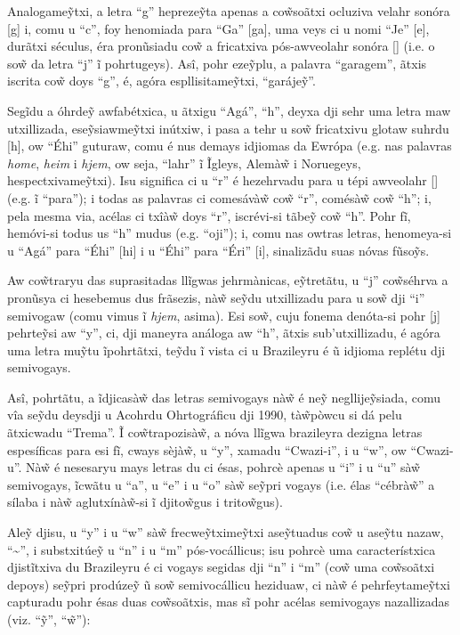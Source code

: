 \documentclass[12pt, a5paper, titlepage]{article}
\begin{document}
\begin{bilingualpages}
    Analogame\~ytxi, a letra ``g'' hepreze\~yta apenas a co\~wsoãtxi ocluziva velahr sonóra [g] i, comu u ``c'', foy henomiada para ``Ga'' [ga], uma veys ci u nomi ``Je'' [\textyogh e], durãtxi séculus, éra pronũsiadu co\~w a fricatxiva pós-awveolahr sonóra [\textyogh] (i.e. o so\~w da letra ``j'' ĩ pohrtugeys). Asî, pohr eze\~yplu, a palavra ``garagem'', ãtxis iscrita co\~w doys ``g'', é, agóra espllisitame\~ytxi, ``garáje\~y''.

    Segĩdu a óhrde\~y awfabétxica, u ãtxigu ``Agá'', ``h'', deyxa dji sehr uma letra maw utxillizada, ese\~ysiawme\~ytxi inútxiw, i pasa a tehr u so\~w fricatxivu glotaw suhrdu [h], ow ``Éhi'' guturaw, comu é nus demays idjiomas da Ewrópa (e.g. nas palavras \textit{home}, \textit{heim} i \textit{hjem}, ow seja, ``lahr'' ĩ Ĩgleys, Alemà\~w i Noruegeys, hespectxivame\~ytxi). Isu significa ci u ``r'' é hezehrvadu para u tépi awveolahr [\textfishhookr] (e.g. ĩ ``para''); i todas as palavras ci comesávà\~w co\~w ``r'', comésà\~w co\~w ``h''; i, pela mesma via, acélas ci txîà\~w doys ``r'', iscrévi-si tãbe\~y co\~w ``h''. Pohr fĩ, hemóvi-si todus us ``h'' mudus (e.g. ``oji''); i, comu nas owtras letras, henomeya-si u ``Agá'' para ``Éhi'' [\textepsilon hi] i u ``Éhi'' para ``Éri'' [\textepsilon \textfishhookr i], sinalizãdu suas nóvas fũso\~ys.

    Aw co\~wtraryu das suprasitadas llĩgwas jehrmànicas, e\~ytretãtu, u ``j'' co\~wséhrva a pronũsya ci hesebemus dus frãsezis, nà\~w se\~ydu utxillizadu para u so\~w dji ``i'' semivogaw (comu vimus ĩ \textit{hjem}, asima). Esi so\~w, cuju fonema denóta-si pohr [j] pehrte\~ysi aw ``y'', ci, dji maneyra análoga aw ``h'', ãtxis sub'utxillizadu, é agóra uma letra mu\~ytu ĩpohrtãtxi, te\~ydu ĩ vista ci u Brazileyru é ũ idjioma replétu dji semivogays. 

    Asî, pohrtãtu, a ĩdjicasà\~w das letras semivogays nà\~w é ne\~y negllije\~ysiada, comu vîa se\~ydu deysdji u Acohrdu Ohrtográficu dji 1990, tà\~wpòwcu si dá pelu ãtxicwadu ``Trema''. Ĩ co\~wtrapozisà\~w, a nóva llĩgwa brazileyra dezigna letras espesíficas para esi fĩ, cways sèjà\~w, u ``y'', xamadu ``Cwazi-i'', i u ``w'', ow ``Cwazi-u''. Nà\~w é nesesaryu mays letras du ci ésas, pohrcè apenas u ``i'' i u ``u'' sà\~w semivogays, ĩcwãtu u ``a'', u ``e'' i u ``o'' sà\~w se\~ypri vogays (i.e. élas ``cébrà\~w'' a sílaba i nà\~w aglutxínà\~w-si ĩ djito\~wgus i trito\~wgus).

    Ale\~y djisu, u ``y'' i u ``w'' sà\~w frecwe\~ytxime\~ytxi ase\~ytuadus co\~w u ase\~ytu nazaw, ``\textasciitilde'', i substxitúe\~y u ``n'' i u ``m'' pós-vocállicus; isu pohrcè uma característxica djistĩtxiva du Brazileyru é ci vogays segidas dji ``n'' i ``m'' (co\~w uma co\~wsoãtxi depoys) se\~ypri prodúze\~y ũ so\~w semivocállicu heziduaw, ci nà\~w é pehrfeytame\~ytxi capturadu pohr ésas duas co\~wsoãtxis, mas sĩ pohr acélas semivogays nazallizadas (viz. ``\~y'', ``\~w''):


\end{bilingualpages}
\end{document}
